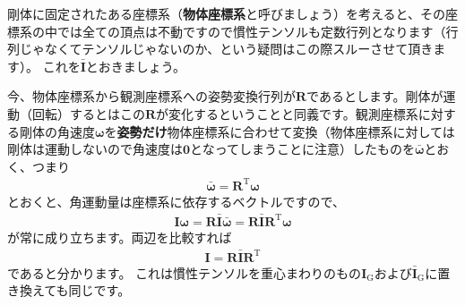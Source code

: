 \documentclass{jsarticle}
\begin{document}
剛体に固定されたある座標系（{\bf 物体座標系}と呼びましょう）を考えると、その座標系の中では全ての頂点は不動ですので慣性テンソルも定数行列となります（行列じゃなくてテンソルじゃないのか、という疑問はこの際スルーさせて頂きます）。
これを$\bar{\boldsymbol{I}}$とおきましょう。

今、物体座標系から観測座標系への姿勢変換行列が$\boldsymbol{R}$であるとします。剛体が運動（回転）するとはこの$\boldsymbol{R}$が変化するということと同義です。観測座標系に対する剛体の角速度$\boldsymbol{\omega}$を{\bf 姿勢だけ}物体座標系に合わせて変換（物体座標系に対しては剛体は運動しないので角速度は$\boldsymbol{0}$となってしまうことに注意）したものを$\bar{\boldsymbol{\omega}}$とおく、つまり
\begin{align*}
\bar{\boldsymbol{\omega}}=\boldsymbol{R}^{\mathrm{T}}\boldsymbol{\omega}
\end{align*}
とおくと、角運動量は座標系に依存するベクトルですので、
\begin{align*}
\boldsymbol{I}\boldsymbol{\omega}=\boldsymbol{R}\bar{\boldsymbol{I}}\bar{\boldsymbol{\omega}}=\boldsymbol{R}\bar{\boldsymbol{I}}\boldsymbol{R}^{\mathrm{T}}\boldsymbol{\omega}
\end{align*}
が常に成り立ちます。両辺を比較すれば
\begin{align*}
\boldsymbol{I}=\boldsymbol{R}\bar{\boldsymbol{I}}\boldsymbol{R}^{\mathrm{T}}
\end{align*}
であると分かります。
これは慣性テンソルを重心まわりのもの$\boldsymbol{I}_{\mathrm{G}}$および$\bar{\boldsymbol{I}}_{\mathrm{G}}$に置き換えても同じです。
\end{document}

